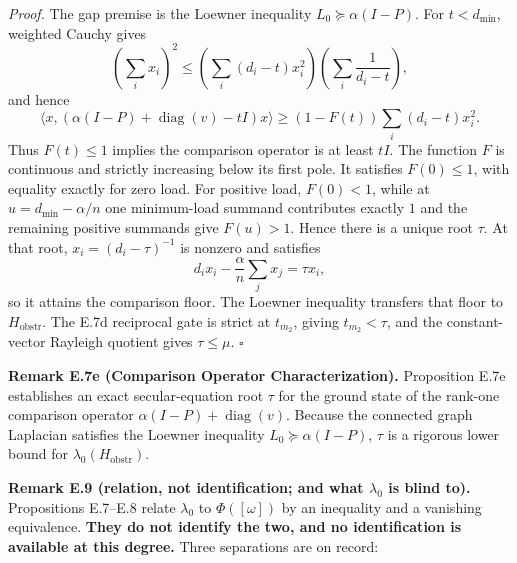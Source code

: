 \documentclass[
]{article}
\begin{document}
\emph{Proof.} The gap premise is the Loewner inequality
\(L_0\succeq\alpha(I-P)\). For \(t<d_{\min}\), weighted Cauchy gives
\[\left(\sum_i x_i\right)^2\le
\left(\sum_i(d_i-t)x_i^2\right)\left(\sum_i\frac1{d_i-t}\right),\]
and hence
\[\langle x,(\alpha(I-P)+\operatorname{diag}(v)-tI)x\rangle
\ge(1-F(t))\sum_i(d_i-t)x_i^2.\]
Thus \(F(t)\le1\) implies the comparison operator is at least \(tI\).
The function \(F\) is continuous and strictly increasing below its first pole.
It satisfies \(F(0)\le1\), with equality exactly for zero load. For positive
load, \(F(0)<1\), while at
\(u=d_{\min}-\alpha/n\) one minimum-load summand contributes exactly \(1\)
and the remaining positive summands give \(F(u)>1\). Hence there is a unique
root \(\tau\). At that root, \(x_i=(d_i-\tau)^{-1}\) is nonzero and satisfies
\[d_i x_i-\frac{\alpha}{n}\sum_jx_j=\tau x_i,\]
so it attains the comparison floor. The Loewner inequality transfers that
floor to \(H_{\mathrm{obstr}}\). The E.7d reciprocal gate is strict at
\(t_{m_2}\), giving \(t_{m_2}<\tau\), and the constant-vector Rayleigh quotient
gives \(\tau\le\mu\). \(\square\)

\textbf{Remark E.7e (Comparison Operator Characterization).} Proposition E.7e establishes an exact secular-equation root \(\tau\) for the ground state of the rank-one comparison operator \(\alpha(I - P) + \operatorname{diag}(v)\). Because the connected graph Laplacian satisfies the Loewner inequality \(L_0 \succeq \alpha(I - P)\), \(\tau\) is a rigorous lower bound for \(\lambda_0(H_{\mathrm{obstr}})\).

\textbf{Remark E.9 (relation, not identification; and what \(\lambda_0\) is blind to).} Propositions E.7--E.8 relate \(\lambda_0\) to \(\Phi([\omega])\) by an inequality and a vanishing equivalence. \textbf{They do not identify the two, and no identification is available at this degree.} Three separations are on record:
\end{document}
